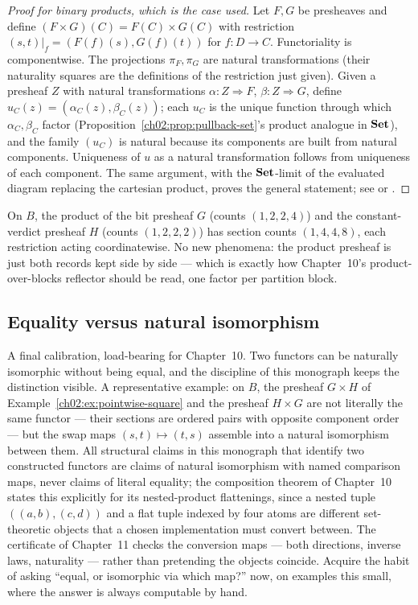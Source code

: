 \begin{proof}[Proof for binary products, which is the case used]
Let $F, G$ be presheaves and define
$(F \times G)(C) = F(C) \times G(C)$ with restriction
$(s, t)|_f = (F(f)(s), G(f)(t))$ for $f : D \to C$. Functoriality is
componentwise. The projections $\pi_F, \pi_G$ are natural
transformations (their naturality squares are the definitions of the
restriction just given). Given a presheaf $Z$ with natural
transformations $\alpha : Z \Rightarrow F$, $\beta : Z \Rightarrow G$,
define $u_C(z) = (\alpha_C(z), \beta_C(z))$; each $u_C$ is the unique
function through which $\alpha_C, \beta_C$ factor
(Proposition~\ref{ch02:prop:pullback-set}'s product analogue in
$\mathbf{Set}$), and the family $(u_C)$ is natural because its components are
built from natural components. Uniqueness of $u$ as a natural
transformation follows from uniqueness of each component. The same
argument, with the $\mathbf{Set}$-limit of the evaluated diagram replacing the
cartesian product, proves the general statement; see
\cite[Ch.~V]{maclanecwm} or \cite[Ch.~3]{riehl}.
\end{proof}

\begin{example}\label{ch02:ex:pointwise-square}
On $B$, the product of the bit presheaf $G$
(counts $(1,2,2,4)$) and the constant-verdict presheaf $H$ (counts
$(1,2,2,2)$) has section counts $(1, 4, 4, 8)$, each restriction
acting coordinatewise. No new phenomena: the product presheaf is just
both records kept side by side --- which is exactly how Chapter~10's
product-over-blocks reflector should be read, one factor per
partition block.
\end{example}

\subsection{Equality versus natural isomorphism}\label{ch02:sec:eq-vs-iso}

A final calibration, load-bearing for Chapter~10. Two functors can be
naturally isomorphic without being equal, and the discipline of this
monograph keeps the distinction visible. A representative example: on
$B$, the presheaf $G \times H$ of
Example~\ref{ch02:ex:pointwise-square} and the presheaf
$H \times G$ are not literally the same functor --- their sections are
ordered pairs with opposite component order --- but the swap maps
$(s, t) \mapsto (t, s)$ assemble into a natural isomorphism between
them. All structural claims in this monograph that identify two
constructed functors are claims of natural isomorphism with named
comparison maps, never claims of literal equality; the composition
theorem of Chapter~10 states this explicitly for its nested-product
flattenings, since a nested tuple $((a, b), (c, d))$ and a flat tuple
indexed by four atoms are different set-theoretic objects that a
chosen implementation must convert between. The certificate of
Chapter~11 checks the conversion maps --- both directions, inverse
laws, naturality --- rather than pretending the objects coincide.
Acquire the habit of asking ``equal, or isomorphic via which map?''
now, on examples this small, where the answer is always computable by
hand.

